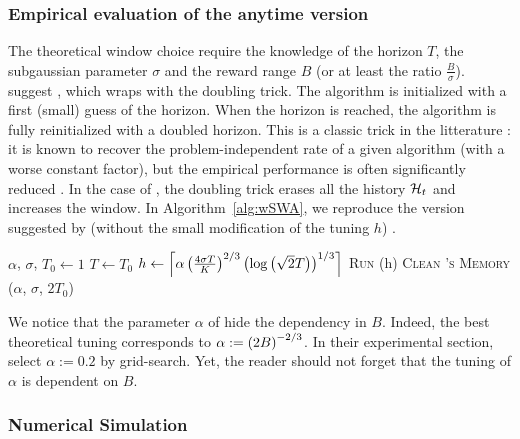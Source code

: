 \subsubsection*{Empirical evaluation of the anytime version {\wSWA}}
The theoretical window choice require the knowledge of the horizon $T$, the subgaussian parameter $\sigma$ and the reward range $B$ (or at least the ratio $\frac{B}{\sigma}$). \citet{levine2017rotting} suggest \wSWA, which wraps \SWA  with the doubling trick. The algorithm is initialized with a first (small) guess of the horizon. When the horizon is reached, the algorithm is fully reinitialized with a doubled horizon. This is a classic trick in the litterature : it is known to recover the problem-independent rate of a given algorithm (with a worse constant factor), but the empirical performance is often significantly reduced \citep{besson2018}. In the case of \wSWA, the doubling trick erases all the history $\mathcal{H}_t$ and increases the window. In Algorithm~\ref{alg:wSWA}, we reproduce the version suggested by \citet{levine2017rotting} (without the small modification of the tuning $h$) . 

\begin{minipage}{\textwidth}
\renewcommand*\footnoterule{}
\begin{savenotes}
\begin{algorithm}[H]
\caption{\wSWA \citep{levine2017rotting} }
\label{alg:wSWA}
\begin{algorithmic}[1]
\Require $\alpha$, $\sigma$, $T_0 \gets 1$
\State $T \gets T_0$
\State $h \gets \left\lceil\alpha\left(\frac{4\sigma T}{K}\right)^{2/3}\left(\log\left(\sqrt{2}T\right)\right)^{1/3}\right\rceil$
		\State \textsc{Run} \SWA(h)
	\EndFor
\State \textsc{Clean \SWA's \textsc{Memory}}
\State \wSWA($\alpha$, $\sigma$, $2T_0$) 
\end{algorithmic}
\end{algorithm}
\end{savenotes}
\end{minipage}

We notice that the parameter $\alpha$ of \wSWA hide the dependency in $B$. Indeed, the best theoretical tuning corresponds to $\alpha := \left(2B\right)^{-2/3}$. In their experimental section, \citet{levine2017rotting} select $\alpha:= 0.2$ by grid-search. Yet, the reader should not forget that the tuning of $\alpha$ is dependent on $B$. 



\subsubsection*{Numerical Simulation}

